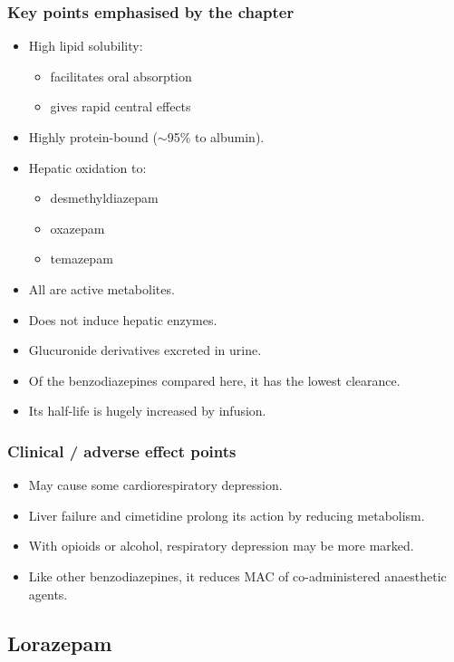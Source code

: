 \documentclass[11pt,a4paper]{article}
\begin{document}
\subsubsection{Key points emphasised by the chapter}
\begin{itemize}
  \item High lipid solubility:
  \begin{itemize}
    \item facilitates oral absorption
    \item gives rapid central effects
  \end{itemize}
  \item Highly protein-bound ($\sim$95\% to albumin).
  \item Hepatic oxidation to:
  \begin{itemize}
    \item desmethyldiazepam
    \item oxazepam
    \item temazepam
  \end{itemize}
  \item All are active metabolites.
  \item Does not induce hepatic enzymes.
  \item Glucuronide derivatives excreted in urine.
  \item Of the benzodiazepines compared here, it has the lowest clearance.
  \item Its half-life is hugely increased by infusion.
\end{itemize}

\subsubsection{Clinical / adverse effect points}
\begin{itemize}
  \item May cause some cardiorespiratory depression.
  \item Liver failure and cimetidine prolong its action by reducing metabolism.
  \item With opioids or alcohol, respiratory depression may be more marked.
  \item Like other benzodiazepines, it reduces MAC of co-administered anaesthetic agents.
\end{itemize}

\subsection{Lorazepam}
\end{document}
